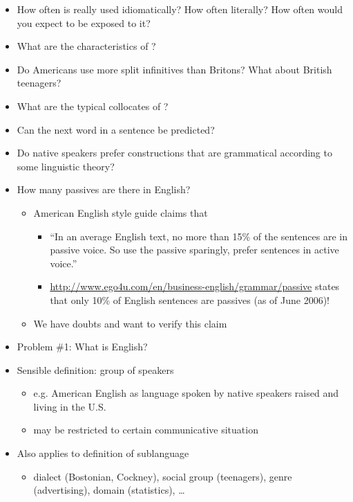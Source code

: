 \documentclass[a4paper,landscape,headrule,footrule,xetex]{foils}
\begin{document}
\begin{itemize}
\item How often is  really used idiomatically?
  How often literally?  How often would you expect to be exposed to
  it?
\item What are the characteristics of ?
\item Do Americans use more split infinitives than
Britons? What about British teenagers?

\item What are the typical collocates of ?
\item Can the next word in a sentence be predicted?
\item Do native speakers prefer constructions that are
grammatical according to some linguistic theory?
\end{itemize}

\begin{itemize}
\item How many passives are there in English?
\begin{itemize}
\item American English style guide claims that
\begin{itemize}
\item “In an average English text, no more than 15\% of the
sentences are in passive voice. So use the passive
sparingly, prefer sentences in active voice.”

\item \url{http://www.ego4u.com/en/business-english/grammar/passive}
states that only 10\% of English sentences are
passives (as of June 2006)!
\end{itemize}
\item We have doubts and want to verify this claim
\end{itemize}
\end{itemize}

\begin{itemize}
\item Problem \#1: What is English?
\item Sensible definition: group of speakers
  \begin{itemize}
  \item e.g. American English as language spoken by
    native speakers raised and living in the U.S.
  \item may be restricted to certain communicative situation
  \end{itemize}
\item Also applies to definition of sublanguage
\begin{itemize}
\item dialect (Bostonian, Cockney), social group (teenagers), genre
  (advertising), domain (statistics), \ldots
\end{itemize}
\end{itemize}
\end{document}
